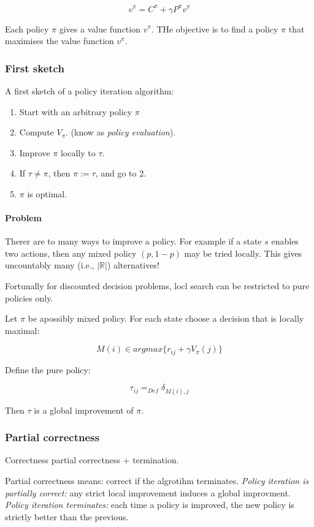 \documentclass{article}
\begin{document}
\[ v^\pi = C^\pi + \gamma P^\pi v^\pi\]

Each policy $\pi$ gives a value function $v^\pi$. THe objective is to find a
policy $\pi$ that maximises the value function $v^\pi$.

\subsubsection{First sketch}
A first sketch of a policy iteration algorithm:
\begin{enumerate}
	\item Start with an arbitrary policy $\pi$
	\item Compute $V_\pi$. (know as \emph{policy evaluation}).
	\item Improve $\pi$ locally to $\tau$.
	\item If $\tau \ne \pi$, then $\pi := \tau$, and go to 2.
	\item $\pi$ is optimal.
\end{enumerate}

\paragraph{Problem} Therer are to many ways to improve a policy.
For example if a state $s$ enables two actions, then any
mixed policy $(p, 1-p)$ may be tried locally. This gives
uncountably many (i.e., $|\mathbb{R}|$) alternatives!

Fortunally for discounted decision problems, locl search can be
restricted to pure policies only.

Let $\pi$ be apossibly mixed policy. For each state choose a decision
that is locally maximal:

\[M(i) \in argmax\{r_{ij} + \gamma V_\pi(j)\} \]

Define the pure policy:

\[ \tau_{ij} =_{Def} \delta_{M(i),j} \]

Then $\tau$ is a global improvement of $\pi$.

\subsubsection{Partial correctness}

Correctness  partial correctness + termination.

Partial correctness means: correct if the algrotihm terminates.
\emph{Policy iteration is partially correct:} any strict
local improvement induces a global improvment.
\emph{Policy iteration terminates:} each time a policy is improved,
the new policy is strictly better than the previous.
\end{document}
